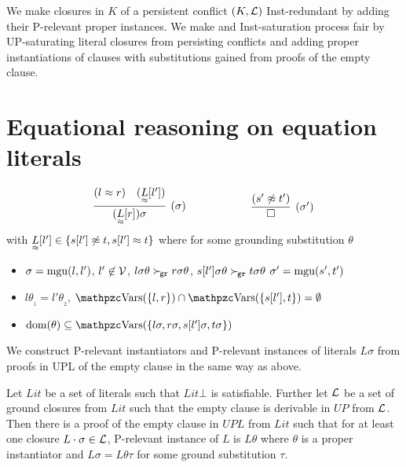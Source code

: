     We make closures in \( K \)
    of a persistent conflict \( (K,\mathcal{L}) \)
    Inst-redundant by adding their P-relevant proper instances.
    We make and Inst-saturation process fair
    by UP-saturating literal closures from persisting conflicts
    and adding proper instantiations of clauses with substitutions
    gained from proofs of the empty clause.


    \section{Equational reasoning on equation literals}\label{sec:reasoning:on:equational:literals}

    \begin{definition}\label{def:unit:superposition:on:literals}
        \begin{gather*}
            \infer[(\sigma)]
            {(\underset{\mEQ}{L}[r])\sigma}
            {(l\mEQ r) & (\underset{\mEQ}{L}[l'])}
        \qquad\qquad\qquad
            \infer[(\sigma')]
            {\emptyclause}
            {(s'\mNE t')}
        \end{gather*}
        with \( \underset{\approx}{L}[l'] \in \{ s[l']\not\approx t, s[l']\approx t \} \) where
        for some grounding substitution \( \theta \)
        \begin{itemize}
            \item
            \( \sigma = \operatorname{mgu}(l,l') \),
            \( l'\not\in\mathcal{V} \),
            \( l\sigma\theta \mathrel\succ_{\!\mathtt{gr}} r\sigma\theta \),
            \( s[l']\sigma\theta \mathrel\succ_{\!\mathtt{gr}} t\sigma\theta \)
            \hfill \( \sigma' = \operatorname{mgu}(s',t') \)
            \item
            \( l\theta_{\!_1} = l'\theta_{\!_2} \),
            \( \var(\{l,r\}) \cap \var(\{ s[l'],t \}) = \emptyset \)
            \item
            \( \domain(\theta) \subseteq \var(\{ l\sigma,r\sigma,s[l']\sigma,t\sigma \}) \)
        \end{itemize}
    \end{definition}

    We construct P-relevant instantiators and P-relevant instances
    of literals \( L\sigma \) from proofs in UPL of the empty clause
    in the same way as above.

    \begin{lemma}
        Let \(Lit\) be a set of literals such that \( Lit\bot \) is satisfiable.
        Further let \( \mathcal{L} \) be a set of ground closures from \( Lit \)
        such that the empty clause is derivable in \( UP \) from \( \mathcal{L} \).
        Then there is a proof of the empty clause in \( UPL \) from \( Lit \)
        such that for at least one closure \( L \cdot \sigma \in \mathcal{L} \),
        P-relevant instance of \(L\) is \( L\theta \)
        where \( \theta \) is a proper instantiator
        and \( L\sigma = L\theta\tau \) for some ground substitution \( \tau \).
    \end{lemma}

